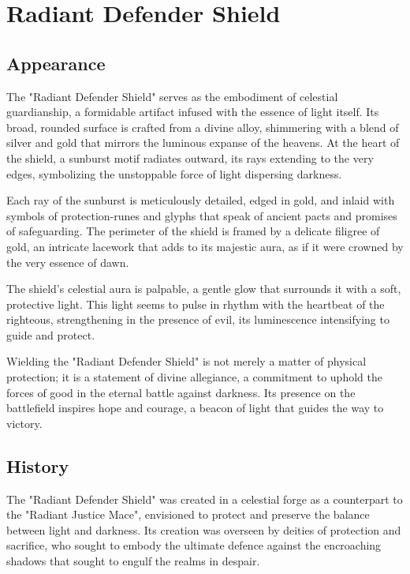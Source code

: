 
\chapter*{Radiant Defender Shield}

\section*{Appearance}
The "Radiant Defender Shield" serves as the embodiment of celestial guardianship, a formidable artifact infused with the essence of light itself. Its broad, rounded surface is crafted from a divine alloy, shimmering with a blend of silver and gold that mirrors the luminous expanse of the heavens. At the heart of the shield, a sunburst motif radiates outward, its rays extending to the very edges, symbolizing the unstoppable force of light dispersing darkness.

Each ray of the sunburst is meticulously detailed, edged in gold, and inlaid with symbols of protection-runes and glyphs that speak of ancient pacts and promises of safeguarding. The perimeter of the shield is framed by a delicate filigree of gold, an intricate lacework that adds to its majestic aura, as if it were crowned by the very essence of dawn.

The shield's celestial aura is palpable, a gentle glow that surrounds it with a soft, protective light. This light seems to pulse in rhythm with the heartbeat of the righteous, strengthening in the presence of evil, its luminescence intensifying to guide and protect.

Wielding the "Radiant Defender Shield" is not merely a matter of physical protection; it is a statement of divine allegiance, a commitment to uphold the forces of good in the eternal battle against darkness. Its presence on the battlefield inspires hope and courage, a beacon of light that guides the way to victory.

\section*{History}
The "Radiant Defender Shield" was created in a celestial forge as a counterpart to the "Radiant Justice Mace", envisioned to protect and preserve the balance between light and darkness. Its creation was overseen by deities of protection and sacrifice, who sought to embody the ultimate defence against the encroaching shadows that sought to engulf the realms in despair.

